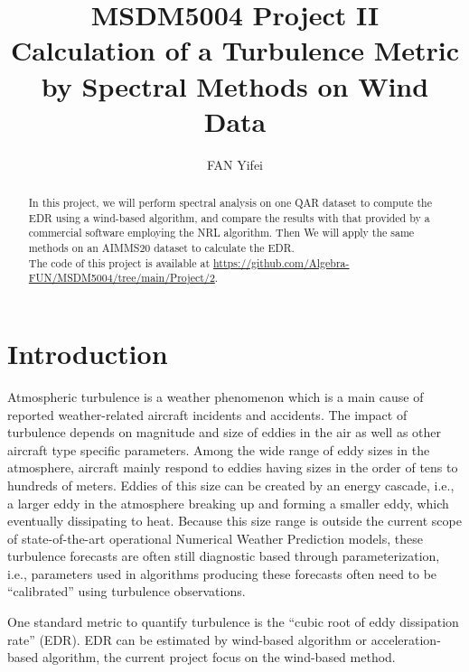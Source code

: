 \documentclass[runningheads]{llncs}
\begin{document}
\title{
    MSDM5004 Project II\\
    Calculation of a Turbulence Metric by Spectral Methods on Wind Data}
\author{FAN Yifei}
\maketitle

\begin{abstract}
    In this project, we will perform spectral analysis on one QAR dataset to compute the EDR using a wind-based algorithm, 
    and compare the results with that provided by a commercial software employing the NRL algorithm. 
    Then We will apply the same methods on an AIMMS20 dataset to calculate the EDR.\\
    The code of this project is available at \url{https://github.com/Algebra-FUN/MSDM5004/tree/main/Project/2}.
\end{abstract}

\section{Introduction}

Atmospheric turbulence is a weather phenomenon which is a main cause of reported weather-related aircraft incidents and accidents. The impact of turbulence depends on magnitude and size of eddies in the air as well as other aircraft type specific parameters.
Among the wide range of eddy sizes in the atmosphere, aircraft mainly respond to eddies having sizes in the order of tens to hundreds of meters. Eddies of this size can be created by an energy cascade, i.e., a larger eddy in the atmosphere breaking up and forming a smaller eddy, which eventually dissipating to heat. Because this size range is outside the current scope of state-of-the-art operational Numerical Weather Prediction models, these turbulence forecasts are often still diagnostic based through parameterization, i.e., parameters used in algorithms producing these forecasts often need to be “calibrated” using turbulence observations.

One standard metric to quantify turbulence is the “cubic root of eddy dissipation rate” (EDR). 
EDR can be estimated by wind-based algorithm or acceleration-based algorithm, the current project focus on the wind-based method.
\end{document}
